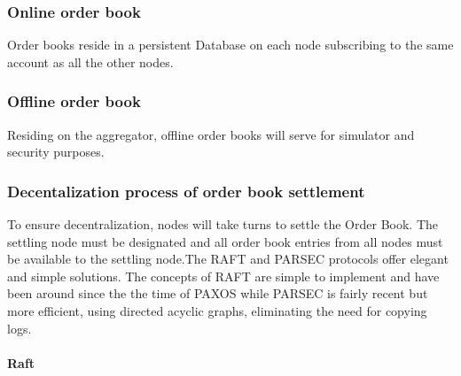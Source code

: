 \documentclass[]{article}
\begin{document}
\subsubsection{Online order book}
Order books reside in a persistent Database on each node subscribing to the same account as all the other nodes.
\subsubsection{Offline order book}
Residing on the aggregator, offline order books will serve for simulator and security purposes.



\subsubsection{Decentalization process of order book settlement}
To ensure decentralization, nodes will take turns to settle the Order Book. The settling node must be designated and all order book entries from all nodes must be available to the settling node.The RAFT\cite{18} and PARSEC\cite{23} protocols
offer elegant and simple solutions. The concepts of RAFT are simple to implement and have been around since the the time of PAXOS\cite{24} while PARSEC is fairly recent but more efficient, using directed acyclic graphs, eliminating the need for copying logs.


\paragraph{Raft}
\end{document}

